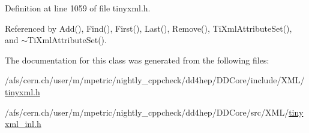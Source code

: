 Definition at line 1059 of file tinyxml.h.

Referenced by Add(), Find(), First(), Last(), Remove(), TiXmlAttributeSet(), and $\sim$TiXmlAttributeSet().

The documentation for this class was generated from the following files:\begin{DoxyCompactItemize}
\item 
/afs/cern.ch/user/m/mpetric/nightly\_\-cppcheck/dd4hep/DDCore/include/XML/\hyperlink{tinyxml_8h}{tinyxml.h}\item 
/afs/cern.ch/user/m/mpetric/nightly\_\-cppcheck/dd4hep/DDCore/src/XML/\hyperlink{tinyxml__inl_8h}{tinyxml\_\-inl.h}\end{DoxyCompactItemize}
